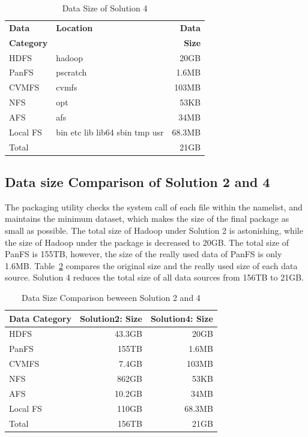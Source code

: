 \documentclass{acm_proc_article-sp}
\begin{document}
\begin{table}
    \centering
    \begin{tabular}{|l|l|r|}
    \hline
    \bf Data &\bf Location & \bf Data \\ 
    \bf Category & & \bf Size\\ \hline
    HDFS & hadoop &20GB \\ \hline
    PanFS & pscratch & 1.6MB \\ \hline
    CVMFS & cvmfs &103MB \\ \hline 
    NFS & opt &53KB \\ \hline
    AFS & afs &34MB \\ \hline
    Local FS& bin etc lib lib64 sbin tmp usr&68.3MB \\ \hline
    Total & &21GB \\ \hline
    \end{tabular}
    \caption{Data Size of Solution 4}
    \label{table:datasize-3rd}
\end{table}    

\subsection{ Data size Comparison of Solution 2 and 4}

The packaging utility checks the system call of each file within the namelist,
and maintains the minimum dataset, which makes the size of the final package 
as small as possible. The total size of Hadoop under Solution 2 is astonishing,
while the size of Hadoop under the package is decreased to 20GB. 
The total size of PanFS is 155TB, however, the size of the really used data of PanFS is only 1.6MB.
Table~\ref{table:datasize-2nd3rd} compares the original size and the really used size of each data source.
Solution 4 reduces the total size of all data sources from 156TB to 21GB.

\begin{table}
    \centering
    \begin{tabular}{|l|r|r|}
    \hline
    \bf Data Category & \bf Solution2: Size & \bf Solution4: Size \\ \hline
    HDFS & 43.3GB & 20GB \\ \hline
    PanFS & 155TB & 1.6MB \\ \hline
    CVMFS & 7.4GB &103MB \\ \hline
    NFS & 862GB &53KB \\ \hline
    AFS & 10.2GB &34MB \\ \hline
    Local FS& 110GB&68.3MB \\ \hline
    Total & 156TB &21GB \\ \hline
    \end{tabular}
    \caption{Data Size Comparison beweeen Solution 2 and 4}
    \label{table:datasize-2nd3rd}
\end{table}
\end{document}
